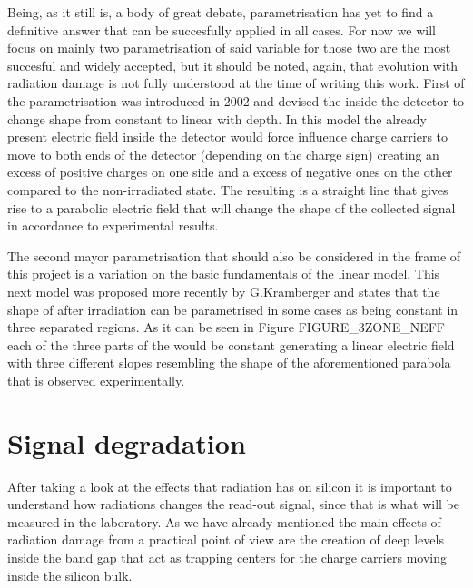 Being, as it still is, a body of great debate, \neff parametrisation has yet to find a definitive answer that can be succesfully applied in all cases. For now we will focus on mainly two parametrisation of said variable for those two are the most succesful and widely accepted, but it should be noted, again, that \neff evolution with radiation damage is not fully understood at the time of writing this work. First of the parametrisation was introduced in 2002 and devised the \neff inside the detector to change shape from constant to linear with depth. In this model the already present electric field inside the detector would force influence charge carriers to move to both ends of the detector (depending on the charge sign) creating an excess of positive charges on one side and a excess of negative ones on the other compared to the non-irradiated state. The resulting \neff is a straight line that gives rise to a parabolic electric field that will change the shape of the collected signal in accordance to experimental results.

The second mayor parametrisation that should also be considered in the frame of this project is a variation on the basic fundamentals of the linear model. This next model was proposed more recently by G.Kramberger and states that the shape of \neff after irradiation can be parametrised in some cases as being constant in three separated regions. As it can be seen in Figure FIGURE\_3ZONE\_NEFF each of the three parts of the \neff would be constant generating a linear electric field with three different slopes resembling the shape of the aforementioned parabola that is observed experimentally.


\section{Signal degradation}

After taking a look at the effects that radiation has on silicon it is important to understand how radiations changes the read-out signal, since that is what will be measured in the laboratory. As we have already mentioned the main effects of radiation damage from a practical point of view are the creation of deep levels inside the band gap that act as trapping centers for the charge carriers moving inside the silicon bulk.
